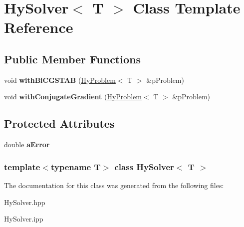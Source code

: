 \hypertarget{classHySolver}{
\section{HySolver$<$ T $>$ Class Template Reference}
\label{classHySolver}
}
\subsection*{Public Member Functions}
\begin{DoxyCompactItemize}
\item 
\hypertarget{classHySolver_ac31ba2f76607bc0de77b6477713bb0bf}{
void {\bfseries withBiCGSTAB} (\hyperlink{classHyProblem}{HyProblem}$<$ T $>$ \&pProblem)}
\label{classHySolver_ac31ba2f76607bc0de77b6477713bb0bf}

\item 
\hypertarget{classHySolver_ab84b7618d9913077db95a4abbc75b9ea}{
void {\bfseries withConjugateGradient} (\hyperlink{classHyProblem}{HyProblem}$<$ T $>$ \&pProblem)}
\label{classHySolver_ab84b7618d9913077db95a4abbc75b9ea}

\end{DoxyCompactItemize}
\subsection*{Protected Attributes}
\begin{DoxyCompactItemize}
\item 
\hypertarget{classHySolver_a2114866d91c7c48ce5100fefb3086c5e}{
double {\bfseries aError}}
\label{classHySolver_a2114866d91c7c48ce5100fefb3086c5e}

\end{DoxyCompactItemize}
\subsubsection*{template$<$typename T$>$ class HySolver$<$ T $>$}



The documentation for this class was generated from the following files:\begin{DoxyCompactItemize}
\item 
HySolver.hpp\item 
HySolver.ipp\end{DoxyCompactItemize}
